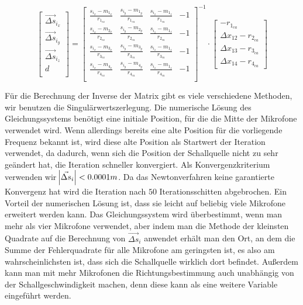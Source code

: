 $$
\begin{bmatrix}
\vec{\Delta{s}}_{i_x} \\
\vec{\Delta{s}}_{i_y} \\
\vec{\Delta{s}}_{i_z} \\
                d \\
\end{bmatrix}
=
{\begin{bmatrix}
\frac{s_{i_x} - m_{1_x}}{r_{1_{ca}}} & \frac{s_{i_y} - m_{1_y}}{r_{1_{ca}}} & \frac{s_{i_z} - m_{1_z}}{r_{1_{ca}}} & -1 \\
\frac{s_{i_x} - m_{2_x}}{r_{2_{ca}}} & \frac{s_{i_y} - m_{2_y}}{r_{2_{ca}}} & \frac{s_{i_z} - m_{1_z}}{r_{2_{ca}}} & -1 \\
\frac{s_{i_x} - m_{3_x}}{r_{3_{ca}}} & \frac{s_{i_y} - m_{3_y}}{r_{3_{ca}}} & \frac{s_{i_z} - m_{1_z}}{r_{3_{ca}}} & -1 \\
\frac{s_{i_x} - m_{4_x}}{r_{4_{ca}}} & \frac{s_{i_y} - m_{4_y}}{r_{4_{ca}}} & \frac{s_{i_z} - m_{1_z}}{r_{4_{ca}}} & -1 \\
\end{bmatrix}}^{-1}
\cdot
\begin{bmatrix}
-r_{1_{ca}}\\
\Delta{x_{12}} - r_{2_{ca}}\\
\Delta{x_{13}} - r_{3_{ca}}\\
\Delta{x_{14}} - r_{4_{ca}}
\end{bmatrix}
$$

Für die Berechnung der Inverse der Matrix gibt es viele verschiedene Methoden, wir benutzen die Singulärwertszerlegung. Die numerische Lösung des Gleichungssystems benötigt eine initiale Position, für die die Mitte der Mikrofone verwendet wird. Wenn allerdings bereits eine alte Position für die vorliegende Frequenz bekannt ist, wird diese alte Position als Startwert der Iteration verwendet, da dadurch, wenn sich die Position der Schallquelle nicht zu sehr geändert hat, die Iteration schneller konvergiert. Als Konvergenzkriterium verwenden wir $\abs{\vec{\Delta{s}}_i} < 0.0001m$. Da das Newtonverfahren keine garantierte Konvergenz hat wird die Iteration nach $50$ Iterationsschitten abgebrochen.
Ein Vorteil der numerischen Lösung ist, dass sie leicht auf beliebig viele Mikrofone erweitert werden kann. Das Gleichungssystem wird überbestimmt, wenn man mehr als vier Mikrofone verwendet, aber indem man die Methode der kleinsten Quadrate auf die Berechnung von $\vec{\Delta{s}}_i$ anwendet erhält man den Ort, an dem die Summe der Fehlerquadrate für alle Mikrofone am geringsten ist, es also am wahrscheinlichsten ist, dass sich die Schallquelle wirklich dort befindet. Außerdem kann man mit mehr Mikrofonen die Richtungsbestimmung auch unabhängig von der Schallgeschwindigkeit machen, denn diese kann als eine weitere Variable eingeführt werden.